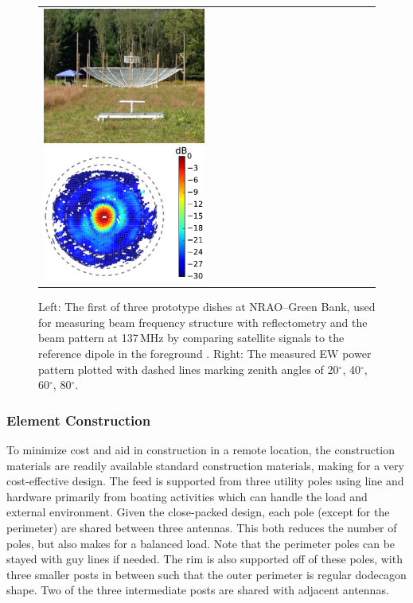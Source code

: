 \documentclass[preprint,11pt]{aastex}
\begin{document}
\begin{figure}[h!]
	\begin{tabular}{ll}
	\begin{minipage}{4.2in}
\includegraphics[width=2.1in]{plots/ref_dipole_and_hera_dish.jpg}
\includegraphics[width=2.1in]{plots/orbcomm_dish_beam_map_530cm_feed.pdf}
	\end{minipage} & 
	\begin{minipage}{2.05in}
	\caption{Left: The first of three prototype dishes at NRAO--Green Bank, used for measuring beam frequency structure with reflectometry and the beam pattern at 137\,MHz by comparing satellite signals to the reference dipole in the foreground \citep{neben_et_al2016}. Right: The measured EW power pattern plotted with dashed lines marking zenith angles of 20$^\circ$, 40$^\circ$, 60$^\circ$, 80$^\circ$.} 
	\label{fig:orbcommexptandbeammap}
	\end{minipage}
	\end{tabular}
	\vspace{-15pt}
\end{figure}

\subsubsection{Element Construction}
To minimize cost and aid in construction in a remote location, the construction materials are readily available standard construction materials, making for a very cost-effective design.  The feed is supported from three utility poles using line and hardware primarily from boating activities which can handle the load and external environment.  Given the close-packed design, each pole (except for the perimeter) are shared between three antennas.  This both reduces the number of poles, but also makes for a balanced load.  Note that the perimeter poles can be stayed with guy lines if needed.   The rim is also supported off of these poles, with three smaller posts in between such that the outer perimeter is regular dodecagon shape.  Two of the three intermediate posts are shared with adjacent antennas.
\end{document}
